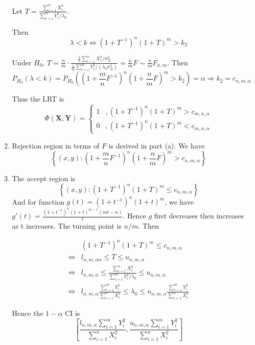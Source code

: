 \documentclass{article}
\begin{document}
\begin{enumerate}[leftmargin = 0 em, label = \arabic*., font = \bfseries]
\begin{enumerate}
		Let $T = \frac{\sum_{i=1}^n X_i^2 }{\sum_{i=1}^m Y_i^2 / \lambda_0}$.

		Then 
		\[\lambda < k \iff (1 + T^{-1})^n (1 + T)^m > k_2\]

		Under $H_0$, $T = \frac{n}{m} \cdot \frac{\frac{1}{n} \sum_{i=1}^n X_i^2 / \sigma_X^2}{\frac{1}{m} \sum_{i=1}^m Y_i^2/(\lambda_0 \sigma_X^2)} = \frac{n}{m} F \sim \frac{n}{m} F_{n, m}$. Then 
		\[P_{H_0}(\lambda < k) = P_{H_0} ((1 + \frac{m}{n} F^{-1})^n ( 1 + \frac{n}{m} F)^{m} > k_2) = \alpha \Rightarrow k_2 = c_{n,m,\alpha}\]

		Thus the LRT is 
		\[\Phi (\bm X , \bm Y) = \begin{cases}
			1  &, (1 + T^{-1})^n (1 + T)^m  > c_{m,n,\alpha}\\
			0 & , (1 + T^{-1})^n (1 + T)^m < c_{m,n,\alpha} 
		\end{cases}\]

		\item 
		Rejection region in terms of $F$ is derived in part (a). We have
		\[\left\{(x,y): \left( 1 + \frac{m}{n} F^{-1} \right)^n \left( 1 + \frac{n}{m} F \right)^m > c_{n,m,\alpha}  \right\}\]

		\item 
		The accept region is 
		\[\left\{(x,y): \left( 1 + T^{-1} \right)^n \left( 1 + T \right)^m \leq c_{n,m,\alpha}  \right\}\]
		And for function $g(t) = (1 + t^{-1})^n (1 + t)^m$, we have $g'(t) = \frac{(1 + t^{-1})^n (1 + t)^{m-1} (mt - n)}{t}$. Hence $g$ first decreases then increases as t increases. The turning point is $n/m$. Then

		\begin{align*}
		&\left( 1 + T^{-1} \right)^n \left( 1 + T \right)^m \leq c_{n,m,\alpha}\\
		\iff & l_{n,m, \alpha\alpha}\leq T \leq u_{n,m,\alpha}\\
		\iff & l_{n,m,\alpha} \leq \frac{\sum_{i=1}^n X_i^2}{\sum_{i=1}^m Y_i^2 / \lambda_0} \leq u_{n,m,\alpha} \\
		\iff & l_{n,m,\alpha} \frac{\sum_{i=1}^m Y_i^2}{\sum_{i=1}^n X_i^2} \leq \lambda_0 \leq u_{n,m,\alpha} \frac{\sum_{i=1}^m Y_i^2}{\sum_{i=1}^n X_i^2} 
		\end{align*}

		Hence the $1 - \alpha$ CI is 
		\[\left[ \frac{l_{n,m,\alpha} \sum_{i=1}^m Y_i^2}{\sum_{i=1}^n X_i^2}, \frac{u_{n,m,\alpha} \sum_{i=1}^m Y_i^2}{\sum_{i=1}^n X_i^2} \right] \]
		
	\end{enumerate}


\end{enumerate}
\end{document}
